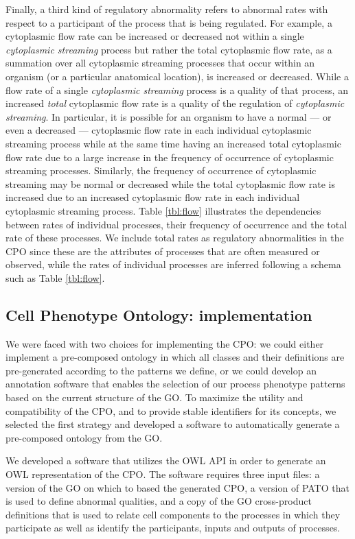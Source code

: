 \documentclass{bioinfo}
\renewcommand{\cite}{\citep}
\begin{document}
Finally, a third kind of regulatory abnormality refers to abnormal
rates with respect to a participant of the process that is being
regulated. For example, a cytoplasmic flow rate can be increased or
decreased not within a single {\em cytoplasmic streaming} process but
rather the total cytoplasmic flow rate, as a summation over all
cytoplasmic streaming processes that occur within an organism (or a
particular anatomical location), is increased or decreased. While a
flow rate of a single {\em cytoplasmic streaming} process is a quality
of that process, an increased {\em total} cytoplasmic flow rate is a
quality of the regulation of {\em cytoplasmic streaming}. In
particular, it is possible for an organism to have a normal --- or
even a decreased --- cytoplasmic flow rate in each individual
cytoplasmic streaming process while at the same time having an
increased total cytoplasmic flow rate due to a large increase in the
frequency of occurrence of cytoplasmic streaming processes. Similarly,
the frequency of occurrence of cytoplasmic streaming may be normal or
decreased while the total cytoplasmic flow rate is increased due to an
increased cytoplasmic flow rate in each individual cytoplasmic
streaming process. Table \ref{tbl:flow} illustrates the dependencies
between rates of individual processes, their frequency of occurrence
and the total rate of these processes. We include total rates as
regulatory abnormalities in the CPO since these are the attributes of
processes that are often measured or observed, while the rates of
individual processes are inferred following a schema such as Table
\ref{tbl:flow}.

\subsection{Cell Phenotype Ontology: implementation}
We were faced with two choices for implementing the CPO: we could
either implement a pre-composed ontology in which all classes and
their definitions are pre-generated according to the patterns we
define, or we could develop an annotation software that enables the
selection of our process phenotype patterns based on the current
structure of the GO.  To maximize the utility and compatibility of the
CPO, and to provide stable identifiers for its concepts, we selected
the first strategy and developed a software to automatically generate
a pre-composed ontology from the GO.

We developed a software that utilizes the OWL API \cite{Horridge2007}
in order to generate an OWL representation of the CPO. The software
requires three input files: a version of the GO on which to based the
generated CPO, a version of PATO that is used to define abnormal
qualities, and a copy of the GO cross-product definitions
\cite{Mungall2010go} that is used to relate cell components to the
processes in which they participate as well as identify the
participants, inputs and outputs of processes.
\end{document}
